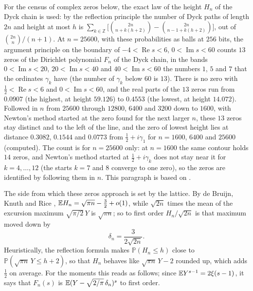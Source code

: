 \begin{resultpar}\label{ev:res:dyckcensus}For the census of complex zeros below, the exact law of the height $H_n$ of the Dyck chain is used: by the reflection principle the number of Dyck paths of length $2n$ and height at most $h$ is $\sum_{k\in\mathbb Z}\big[\binom{2n}{n+k(h+2)}-\binom{2n}{n-1+k(h+2)}\big]$, out of $\binom{2n}{n}/(n+1)$. At $n=25600$, with these probabilities as balls at $256$ bits, the argument principle on the boundary of $-4<\operatorname{Re}s<6$, $0<\operatorname{Im}s<60$ counts $13$ zeros of the Dirichlet polynomial $F_n$ of the Dyck chain, in the bands $0<\operatorname{Im}s<20$, $20<\operatorname{Im}s<40$ and $40<\operatorname{Im}s<60$ the numbers $1$, $5$ and $7$ that the ordinates $\gamma_k$ have (the number of $\gamma_k$ below $60$ is $13$). There is no zero with $\tfrac12<\operatorname{Re}s<6$ and $0<\operatorname{Im}s<60$, and the real parts of the $13$ zeros run from $0.0907$ (the highest, at height $59.126$) to $0.4553$ (the lowest, at height $14.072$). Followed in $n$ from $25600$ through $12800$, $6400$ and $3200$ down to $1600$, with Newton's method started at the zero found for the next larger $n$, these $13$ zeros stay distinct and to the left of the line, and the zero of lowest height lies at distance $0.3082$, $0.1544$ and $0.0773$ from $\tfrac12+i\gamma_1$ for $n=1600$, $6400$ and $25600$ (computed). The count is for $n=25600$ only: at $n=1600$ the same contour holds $14$ zeros, and Newton's method started at $\tfrac12+i\gamma_k$ does not stay near it for $k=4,\dots,12$ (the starts $k=7$ and $8$ converge to one zero), so the zeros are identified by following them in $n$. This paragraph is based on \cite{P26excursion}.\end{resultpar}

The side from which these zeros approach is set by the lattice. By de Bruijn, Knuth and Rice \cite{deBruijnKnuthRice72}, $\mathbb{E} H_n=\sqrt{\pi n}-\frac32+o(1)$, while $\sqrt{2n}$ times the mean of the excursion maximum $\sqrt{\pi/2}\,Y$ is $\sqrt{\pi n}$; so to first order $H_n/\sqrt{2n}$ is that maximum moved down by
\[
\delta_n=\frac3{2\sqrt{2n}} .
\]
Heuristically, the reflection formula makes $\mathbb P(H_n\le h)$ close to $\mathbb P(\sqrt{\pi n}\,Y\le h+2)$, so that $H_n$ behaves like $\sqrt{\pi n}\,Y-2$ rounded up, which adds $\frac12$ on average. For the moments this reads as follows; since $\mathbb{E} Y^{s-1}=2\xi(s-1)$, it says that $F_n(s)$ is $\mathbb{E}(Y-\sqrt{2/\pi}\,\delta_n)^s$ to first order.

